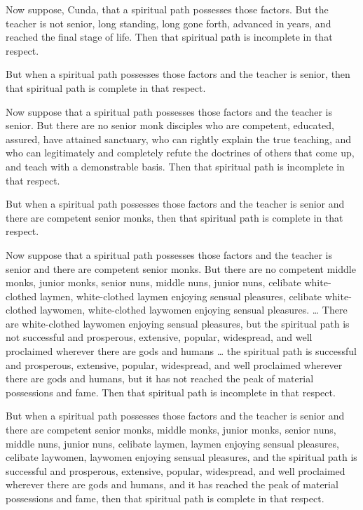 \documentclass[12pt,openany]{book}%
\begin{document}
Now suppose, Cunda, that a spiritual path possesses those factors. But the teacher is not senior, long standing, long gone forth, advanced in years, and reached the final stage of life. Then that spiritual path is incomplete in that respect. 

But when a spiritual path possesses those factors and the teacher is senior, then that spiritual path is complete in that respect. 

Now suppose that a spiritual path possesses those factors and the teacher is senior. But there are no senior monk disciples who are competent, educated, assured, have attained sanctuary, who can rightly explain the true teaching, and who can legitimately and completely refute the doctrines of others that come up, and teach with a demonstrable basis. Then that spiritual path is incomplete in that respect. 

But when a spiritual path possesses those factors and the teacher is senior and there are competent senior monks, then that spiritual path is complete in that respect. 

Now suppose that a spiritual path possesses those factors and the teacher is senior and there are competent senior monks. But there are no competent middle monks, junior monks, senior nuns, middle nuns, junior nuns, celibate white-clothed laymen, white-clothed laymen enjoying sensual pleasures, celibate white-clothed laywomen, white-clothed laywomen enjoying sensual pleasures. … There are white-clothed laywomen enjoying sensual pleasures, but the spiritual path is not successful and prosperous, extensive, popular, widespread, and well proclaimed wherever there are gods and humans … the spiritual path is successful and prosperous, extensive, popular, widespread, and well proclaimed wherever there are gods and humans, but it has not reached the peak of material possessions and fame. Then that spiritual path is incomplete in that respect. 

But when a spiritual path possesses those factors and the teacher is senior and there are competent senior monks, middle monks, junior monks, senior nuns, middle nuns, junior nuns, celibate laymen, laymen enjoying sensual pleasures, celibate laywomen, laywomen enjoying sensual pleasures, and the spiritual path is successful and prosperous, extensive, popular, widespread, and well proclaimed wherever there are gods and humans, and it has reached the peak of material possessions and fame, then that spiritual path is complete in that respect. 
\end{document}
